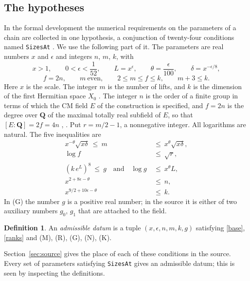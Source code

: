 \documentclass[11pt]{amsart}
\theoremstyle{definition}
\newtheorem*{definition}{Definition}
\theoremstyle{remark}
\newcommand{\Q}{\mathbf Q}
\newcommand{\src}[1]{\texttt{#1}}
\newcommand{\tagM}{\textup{(M)}}
\newcommand{\tagR}{\textup{(R)}}
\newcommand{\tagG}{\textup{(G)}}
\newcommand{\tagN}{\textup{(N)}}
\newcommand{\tagK}{\textup{(K)}}
\begin{document}
\subsection{The hypotheses}
In the formal development the numerical requirements on the parameters of a chain are collected in one hypothesis, a conjunction of twenty-four conditions named \src{SizesAt} \cite{archive}. We use the following part of it. The parameters are real numbers $x$ and $\epsilon$ and integers $n$, $m$, $k$, with
\begin{equation}\label{base}
 x>1,\qquad 0<\epsilon<\frac1{52},\qquad L=x^\epsilon,\qquad\theta=\frac\epsilon{100},\qquad\delta=x^{-\epsilon/8},
\end{equation}
\begin{equation}\label{ranks}
 f=2n,\qquad m\ \text{even},\qquad 2\le m\le f\le k,\qquad m+3\le k .
\end{equation}
Here $x$ is the scale. The integer $m$ is the number of lifts, and $k$ is the dimension of the first Hermitian space $X_0$ \cite[p.~25]{Zhang}. The integer $n$ is the order of a finite group in terms of which the CM field $E$ of the construction is specified, and $f=2n$ is the degree over $\Q$ of the maximal totally real subfield of $E$, so that $[E:\Q]=2f=4n$ \cite[pp.~43 and 51]{Zhang}, \cite[(H3), p.~11]{Slijepcevic}. Put $r=m/2-1$, a nonnegative integer. All logarithms are natural. The five inequalities are
\begin{align}
 x^{-\theta}\sqrt{x\delta}\ \le\ m\ &\le\ x^{\theta}\sqrt{x\delta}, \tag{M}\\
 \log f\ &\le\ \sqrt r, \tag{R}\\
 (k\,e^{L})^{8}\ \le\ g\quad\text{and}\quad\log g\ &\le\ x^{\theta}L, \tag{G}\\
 x^{2+8\epsilon-\theta}\ &\le\ n, \tag{N}\\
 x^{9/2+10\epsilon-\theta}\ &\le\ k. \tag{K}
\end{align}
In \tagG{} the number $g$ is a positive real number; in the source it is either of two auxiliary numbers $g_0$, $g_1$ that are attached to the field.

\begin{definition}
An \emph{admissible datum} is a tuple $(x,\epsilon,n,m,k,g)$ satisfying \eqref{base}, \eqref{ranks} and \tagM, \tagR, \tagG, \tagN, \tagK.
\end{definition}

Section~\ref{sec:source} gives the place of each of these conditions in the source. Every set of parameters satisfying \src{SizesAt} gives an admissible datum; this is seen by inspecting the definitions.
\end{document}
